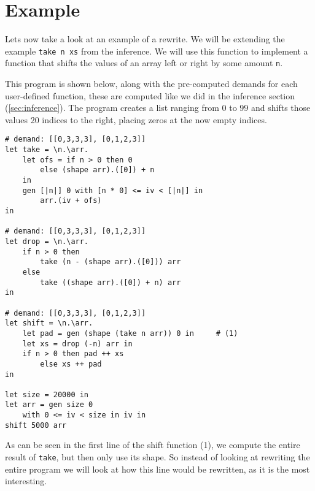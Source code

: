 \documentclass[../main.tex]{subfiles}
\begin{document}
\section{Example}
Lets now take a look at an example of a rewrite. We will be extending the example \texttt{take n xs} from the inference. We will use this function to implement a function that shifts the values of an array left or right by some amount \texttt{n}.

This program is shown below, along with the pre-computed demands for each user-defined function, these are computed like we did in the inference section (\ref{sec:inference}). The program creates a list ranging from $0$ to $99$ and shifts those values 20 indices to the right, placing zeros at the now empty indices.
\begin{verbatim}
# demand: [[0,3,3,3], [0,1,2,3]]
let take = \n.\arr.
    let ofs = if n > 0 then 0
        else (shape arr).([0]) + n
    in
    gen [|n|] 0 with [n * 0] <= iv < [|n|] in
        arr.(iv + ofs)
in

# demand: [[0,3,3,3], [0,1,2,3]]
let drop = \n.\arr.
    if n > 0 then
        take (n - (shape arr).([0])) arr
    else
        take ((shape arr).([0]) + n) arr
in

# demand: [[0,3,3,3], [0,1,2,3]]
let shift = \n.\arr.
    let pad = gen (shape (take n arr)) 0 in     # (1)
    let xs = drop (-n) arr in
    if n > 0 then pad ++ xs
        else xs ++ pad
in

let size = 20000 in
let arr = gen size 0
    with 0 <= iv < size in iv in
shift 5000 arr
\end{verbatim}

As can be seen in the first line of the shift function (1), we compute the entire result of \texttt{take}, but then only use its shape. So instead of looking at rewriting the entire program we will look at how this line would be rewritten, as it is the most interesting.
\end{document}
